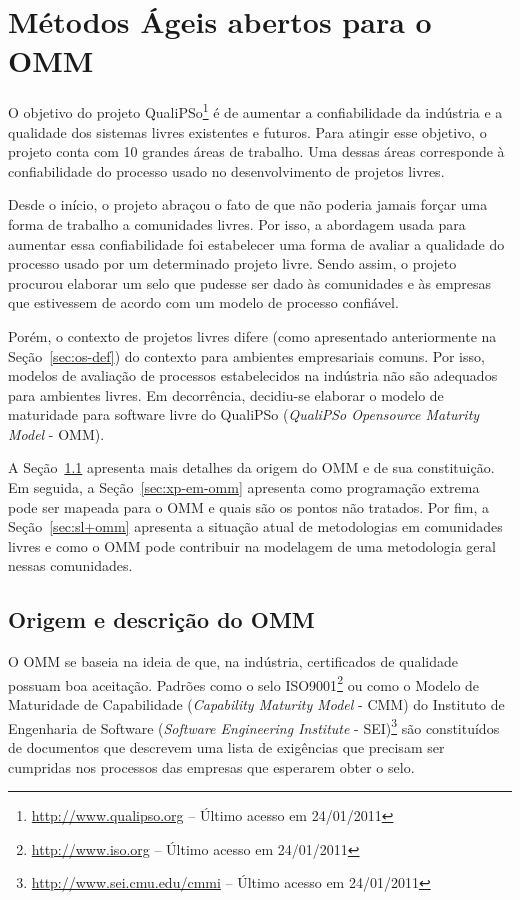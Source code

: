 \chapter{Métodos Ágeis abertos para o OMM}
\label{cap:omm}

O objetivo do projeto QualiPSo\footnote{\url{http://www.qualipso.org}
  -- Último acesso em 24/01/2011} é de aumentar a confiabilidade da
indústria e a qualidade dos sistemas livres existentes e futuros. Para
atingir esse objetivo, o projeto conta com 10 grandes áreas de
trabalho. Uma dessas áreas corresponde à confiabilidade do processo
usado no desenvolvimento de projetos livres.

Desde o início, o projeto abraçou o fato de que não poderia jamais
forçar uma forma de trabalho a comunidades livres. Por isso, a
abordagem usada para aumentar essa confiabilidade foi estabelecer uma
forma de avaliar a qualidade do processo usado por um determinado
projeto livre. Sendo assim, o projeto procurou elaborar um selo que
pudesse ser dado às comunidades e às empresas que estivessem de acordo
com um modelo de processo confiável.

Porém, o contexto de projetos livres difere (como apresentado
anteriormente na Seção~\ref{sec:os-def}) do contexto para ambientes
empresariais comuns. Por isso, modelos de avaliação de processos
estabelecidos na indústria não são adequados para ambientes livres. Em
decorrência, decidiu-se elaborar o modelo de maturidade para software
livre do QualiPSo (\textit{QualiPSo Opensource Maturity Model} - OMM).

A Seção~\ref{sec:o-que-eh-omm} apresenta mais detalhes da origem do
OMM e de sua constituição. Em seguida, a Seção~\ref{sec:xp-em-omm}
apresenta como programação extrema pode ser mapeada para o OMM e quais
são os pontos não tratados. Por fim, a Seção~\ref{sec:sl+omm}
apresenta a situação atual de metodologias em comunidades livres e
como o OMM pode contribuir na modelagem de uma metodologia geral
nessas comunidades.

\section{Origem e descrição do OMM}
\label{sec:o-que-eh-omm}

O OMM se baseia na ideia de que, na indústria, certificados de
qualidade possuam boa aceitação. Padrões como o selo
ISO9001\footnote{\url{http://www.iso.org} -- Último acesso em
  24/01/2011} ou como o Modelo de Maturidade de Capabilidade
(\textit{Capability Maturity Model} - CMM) do Instituto de Engenharia
de Software (\textit{Software Engineering Institute} -
SEI)\footnote{\url{http://www.sei.cmu.edu/cmmi} -- Último acesso em
  24/01/2011} são constituídos de documentos que descrevem uma lista
de exigências que precisam ser cumpridas nos processos das empresas
que esperarem obter o selo.

